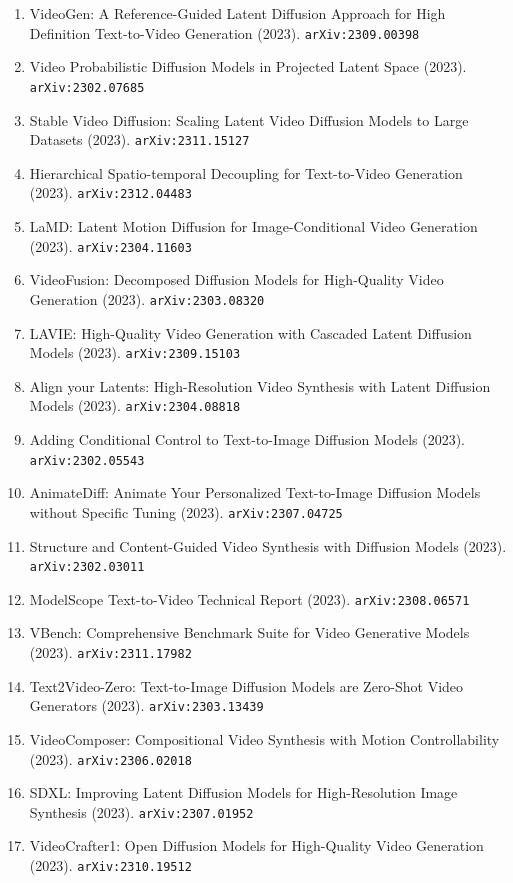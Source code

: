\documentclass[11pt]{article}
\begin{document}
\begin{enumerate}
  \item VideoGen: A Reference-Guided Latent Diffusion Approach for High
  Definition Text-to-Video Generation (2023). \texttt{arXiv:2309.00398}
  \item Video Probabilistic Diffusion Models in Projected Latent Space (2023). \texttt{arXiv:2302.07685}
  \item Stable Video Diffusion: Scaling Latent Video Diffusion Models to Large
  Datasets (2023). \texttt{arXiv:2311.15127}
  \item Hierarchical Spatio-temporal Decoupling for Text-to-Video Generation (2023). \texttt{arXiv:2312.04483}
  \item LaMD: Latent Motion Diffusion for Image-Conditional Video Generation (2023). \texttt{arXiv:2304.11603}
  \item VideoFusion: Decomposed Diffusion Models for High-Quality Video
  Generation (2023). \texttt{arXiv:2303.08320}
  \item LAVIE: High-Quality Video Generation with Cascaded Latent Diffusion
  Models (2023). \texttt{arXiv:2309.15103}
  \item Align your Latents: High-Resolution Video Synthesis with Latent
  Diffusion Models (2023). \texttt{arXiv:2304.08818}
  \item Adding Conditional Control to Text-to-Image Diffusion Models (2023). \texttt{arXiv:2302.05543}
  \item AnimateDiff: Animate Your Personalized Text-to-Image Diffusion Models
  without Specific Tuning (2023). \texttt{arXiv:2307.04725}
  \item Structure and Content-Guided Video Synthesis with Diffusion Models (2023). \texttt{arXiv:2302.03011}
  \item ModelScope Text-to-Video Technical Report (2023). \texttt{arXiv:2308.06571}
  \item VBench: Comprehensive Benchmark Suite for Video Generative Models (2023). \texttt{arXiv:2311.17982}
  \item Text2Video-Zero: Text-to-Image Diffusion Models are Zero-Shot Video
  Generators (2023). \texttt{arXiv:2303.13439}
  \item VideoComposer: Compositional Video Synthesis with Motion Controllability (2023). \texttt{arXiv:2306.02018}
  \item SDXL: Improving Latent Diffusion Models for High-Resolution Image
  Synthesis (2023). \texttt{arXiv:2307.01952}
  \item VideoCrafter1: Open Diffusion Models for High-Quality Video Generation (2023). \texttt{arXiv:2310.19512}

\end{enumerate}
\end{document}
